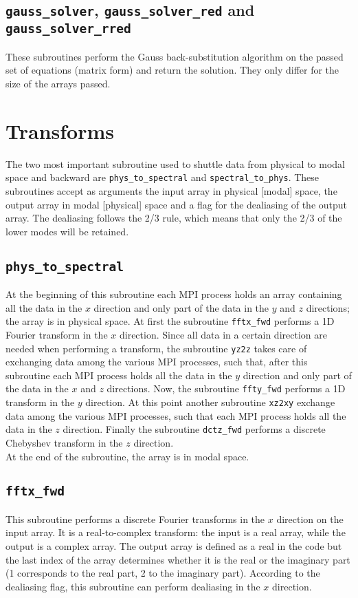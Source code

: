 \subsection{\texttt{gauss\_solver}, \texttt{gauss\_solver\_red} and \texttt{gauss\_solver\_rred}}
These subroutines perform the Gauss back-substitution algorithm on the passed set of equations (matrix form) and return the solution. They only differ for the size of the arrays passed.

\section{Transforms}
The two most important subroutine used to shuttle data from physical to modal space and backward are \texttt{phys\_to\_spectral} and \texttt{spectral\_to\_phys}. These subroutines accept as arguments the input array in physical [modal] space, the output array in modal [physical] space and a flag for the dealiasing of the output array. The dealiasing follows the 2/3 rule, which means that only the 2/3 of the lower modes will be retained.

\subsection{\texttt{phys\_to\_spectral}}
At the beginning of this subroutine each MPI process holds an array containing all the data in the $x$ direction and only part of the data in the $y$ and $z$ directions; the array is in physical space. At first the subroutine \texttt{fftx\_fwd} performs a 1D Fourier transform in the $x$ direction. Since all data in a certain direction are needed when performing a transform, the subroutine \texttt{yz2z} takes care of exchanging data among the various MPI processes, such that, after this subroutine each MPI process holds all the data in the $y$ direction and only part of the data in the $x$ and $z$ directions. Now, the subroutine \texttt{ffty\_fwd} performs a 1D transform in the $y$ direction. At this point another subroutine \texttt{xz2xy} exchange data among the various MPI processes, such that each MPI process holds all the data in the $z$ direction. Finally the subroutine \texttt{dctz\_fwd} performs a discrete Chebyshev transform in the $z$ direction.\\
At the end of the subroutine, the array is in modal space.



\subsection{\texttt{fftx\_fwd}}
\label{sec: fftx}
This subroutine performs a discrete Fourier transforms in the $x$ direction on the input array. It is a real-to-complex transform: the input is a real array, while the output is a complex array. The output array is defined as a real in the code but the last index of the array determines whether it is the real or the imaginary part (1 corresponds to the real part, 2 to the imaginary part). According to the dealiasing flag, this subroutine can perform dealiasing in the $x$ direction.

